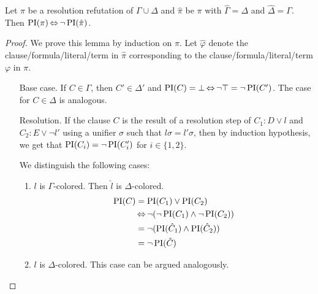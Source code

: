 \newcommand{\primex}[1]{\ensuremath{\hat{#1}}}
\begin{lemma}
	\label{lemma:symmetry}
	Let $\pi$ be a resolution refutation of $\Gamma \cup \Delta$ and
	$\primex\pi$ be $\pi$ with $\primex\Gamma = \Delta$ and $\primex\Delta = \Gamma$.
	Then $\PI(\pi) \semiff \lnot \PI(\primex\pi)$.
\end{lemma}
\begin{proof}
	We prove this lemma by induction on $\pi$.
	Let $\primex\varphi$ denote the clause/formula/literal/term in $\primex\pi$ corresponding to the clause/formula/literal/term $\varphi$ in $\pi$.

	\newcommand{\p}[1]{\primex{#1}}
	\begin{itemize}
		\item[Base case.]
			If $C \in \Gamma$, then $C' \in \Delta'$ and $\operatorname{PI}(C) = \bot \operatorname{\Leftrightarrow} \lnot \top = \lnot \operatorname{PI}(C')$. 
			The case for $C\in \Delta$ is analogous.

		\item[Resolution.]
			If the clause $C$ is the result of a resolution step of $C_1: D \lor l$ and $C_2: E \lor \lnot l'$ using a unifier $\sigma$ such that $l\sigma = l'\sigma$, then by induction hypothesis, we get that
			$\operatorname{PI}(C_i) = \lnot \operatorname{PI}(C'_i)$ for $i\in \{1,2\}$.

			We distinguish the following cases:
			\begin{enumerate}
					\item $l$ is $\Gamma$-colored. Then $\primex l$ is $\Delta$-colored.
						\begin{align*}
							\PI(C) &= \PI(C_1) \lor \PI(C_2)\\
														 &\semiff \lnot ( \lnot \PI(C_1) \land \lnot \PI(C_2) )\\
														 &= \lnot ( \PI(\primex C_1) \land \PI(\primex C_2) ) \\
														 &= \lnot \PI(\primex C)  
						\end{align*}
					\item $l$ is $\Delta$-colored. This case can be argued analogously.


\end{enumerate}
\end{itemize}
\end{proof}
